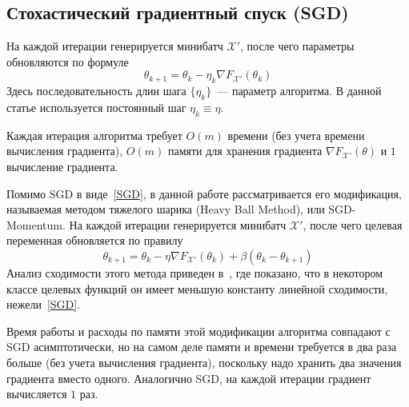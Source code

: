 \documentclass[preprint,12pt]{elsarticle}
\begin{document}
\subsection{Стохастический градиентный спуск (SGD)}\label{SS:2.1}
На каждой итерации генерируется минибатч $\mathcal{X}'$, после чего параметры обновляются по формуле
\begin{equation}\label{SGD}
    \theta_{k+1} = \theta_k - \eta_k \nabla F_{\mathcal{X}'} (\theta_k)
\end{equation}
Здесь последовательность длин шага $\{\eta_k\}$~--- параметр алгоритма. В данной статье используется постоянный шаг $\eta_k \equiv \eta$.

Каждая итерация алгоритма требует $O(m)$ времени (без учета времени вычисления градиента), $O(m)$ памяти для хранения градиента $\nabla F_{\mathcal{X}'}(\theta)$ и $1$ вычисление градиента.

Помимо SGD в виде~\ref{SGD}, в данной работе рассматривается его модификация, называемая методом тяжелого шарика (Heavy Ball Method), или SGD-Momentum. 
На каждой итерации генерируется минибатч $\mathcal{X}'$, после чего целевая переменная обновляется по правилу
\begin{equation}\label{HB}
    \theta_{k+1} = \theta_k - \eta \nabla F_{\mathcal{X}'}(\theta_k) + \beta (\theta_k - \theta_{k+1})
\end{equation}
Анализ сходимости этого метода приведен в~\cite{HBconvergence}, где показано, что в некотором классе целевых функций он имеет меньшую константу линейной сходимости, нежели~\ref{SGD}.

Время работы и расходы по памяти этой модификации алгоритма совпадают с SGD асимптотически, но на самом деле памяти и времени требуется в два раза больше (без учета вычисления градиента), поскольку надо хранить два значения градиента вместо одного. Аналогично SGD, на каждой итерации градиент вычисляется $1$ раз.
\end{document}
